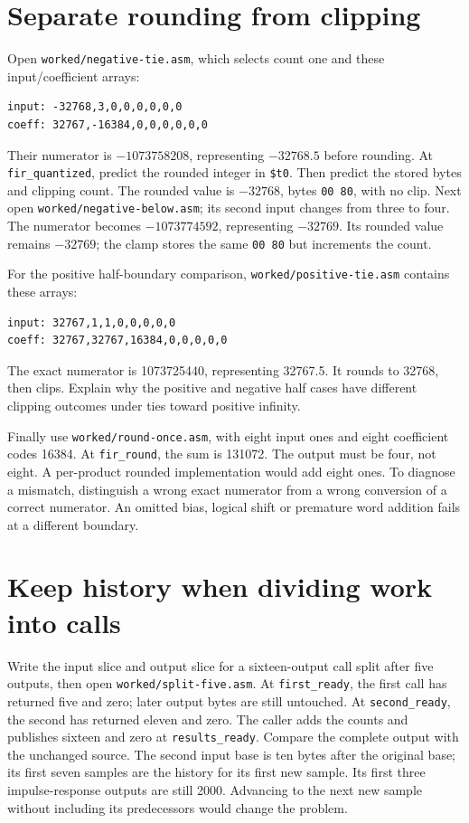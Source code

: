 \section{Separate rounding from clipping}

Open \texttt{worked/negative-tie.asm}, which selects count one and these
input/coefficient arrays:
\begin{verbatim}
input: -32768,3,0,0,0,0,0,0
coeff: 32767,-16384,0,0,0,0,0,0
\end{verbatim}
Their numerator is $-1073758208$, representing $-32768.5$ before rounding.
At \texttt{fir\_quantized}, predict the rounded integer in \texttt{\$t0}.
Then predict the stored bytes and clipping count. The rounded value is $-32768$, bytes \texttt{00 80}, with no clip.
Next open \texttt{worked/negative-below.asm}; its second input changes from
three to four. The numerator becomes
$-1073774592$, representing $-32769$. Its rounded value remains $-32769$;
the clamp stores the same \texttt{00 80} but increments the count.

For the positive half-boundary comparison, \texttt{worked/positive-tie.asm}
contains these arrays:
\begin{verbatim}
input: 32767,1,1,0,0,0,0,0
coeff: 32767,32767,16384,0,0,0,0,0
\end{verbatim}
The exact numerator is 1073725440,
representing 32767.5. It rounds to 32768, then clips. Explain why the positive
and negative half cases have different clipping outcomes under ties toward
positive infinity.

Finally use \texttt{worked/round-once.asm}, with eight input ones and eight
coefficient codes 16384. At
\texttt{fir\_round}, the sum is 131072. The output must be four, not eight.
A per-product rounded implementation would add eight ones. To diagnose a
mismatch, distinguish a wrong exact numerator from a wrong conversion of a
correct numerator. An omitted bias, logical shift or premature word addition
fails at a different boundary.

\section{Keep history when dividing work into calls}

Write the input slice and output slice for a sixteen-output call split after
five outputs, then open \texttt{worked/split-five.asm}. At
\texttt{first\_ready}, the first call has returned five and zero; later output
bytes are still untouched. At \texttt{second\_ready}, the second has returned
eleven and zero. The caller adds the counts and publishes sixteen and zero at
\texttt{results\_ready}. Compare the complete output with the unchanged source. The second input base is ten bytes after the original base; its
first seven samples are the history for its first new sample. Its first three
impulse-response outputs are still 2000. Advancing to the next new sample
without including its predecessors would change the problem.

